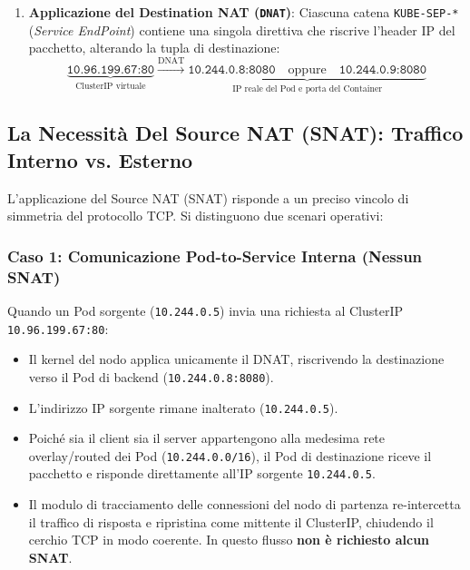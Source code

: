 \documentclass[11pt, a4paper]{article}
\begin{document}
\begin{enumerate}
    \item \textbf{Applicazione del Destination NAT (\texttt{DNAT})}:
    Ciascuna catena \texttt{KUBE-SEP-*} (\emph{Service EndPoint}) contiene una singola direttiva che riscrive l'header IP del pacchetto, alterando la tupla di destinazione:
    \[
        \underbrace{\texttt{10.96.199.67:80}}_{\text{ClusterIP virtuale}} \xrightarrow{\text{DNAT}} \underbrace{\texttt{10.244.0.8:8080} \quad \text{oppure} \quad \texttt{10.244.0.9:8080}}_{\text{IP reale del Pod e porta del Container}}
    \]
\end{enumerate}

\subsection{La Necessità Del Source NAT (SNAT): Traffico Interno vs. Esterno}
L'applicazione del Source NAT (SNAT) risponde a un preciso vincolo di simmetria del protocollo TCP. Si distinguono due scenari operativi:

\subsubsection{Caso 1: Comunicazione Pod-to-Service Interna (Nessun SNAT)}
Quando un Pod sorgente (\texttt{10.244.0.5}) invia una richiesta al ClusterIP \texttt{10.96.199.67:80}:
\begin{itemize}[noitemsep]
    \item Il kernel del nodo applica unicamente il DNAT, riscrivendo la destinazione verso il Pod di backend (\texttt{10.244.0.8:8080}).
    \item L'indirizzo IP sorgente rimane inalterato (\texttt{10.244.0.5}).
    \item Poiché sia il client sia il server appartengono alla medesima rete overlay/routed dei Pod (\texttt{10.244.0.0/16}), il Pod di destinazione riceve il pacchetto e risponde direttamente all'IP sorgente \texttt{10.244.0.5}.
    \item Il modulo di tracciamento delle connessioni del nodo di partenza re-intercetta il traffico di risposta e ripristina come mittente il ClusterIP, chiudendo il cerchio TCP in modo coerente. In questo flusso \textbf{non è richiesto alcun SNAT}.
\end{itemize}
\end{document}
